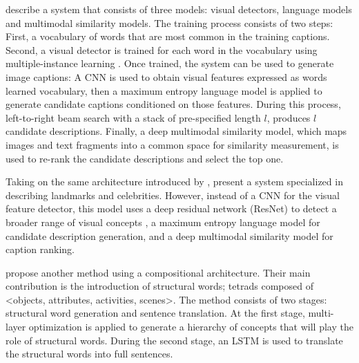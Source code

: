 \citet{Fang2015} describe a system that consists of three models: visual detectors, language models and multimodal similarity models. The training process consists of two steps: First, a vocabulary of words that are most common in the training captions. Second, a visual detector is trained for each word in the vocabulary using multiple-instance learning  \citep{Viola2005}. Once trained, the system can be used to generate image captions: A CNN \citep{Krizhevsky2012} is used to obtain visual features expressed as words learned vocabulary, then a maximum entropy language model \citep{Berger1996} is applied to generate candidate captions conditioned on those features. During this process, left-to-right beam search \citep{Ratnaparkhi2000} with a stack of pre-specified length $l$, produces $l$ candidate descriptions. Finally, a deep multimodal similarity model, which maps images and text fragments into a common space for similarity measurement, is used to re-rank the candidate descriptions and select the top one.

Taking on the same architecture introduced by \citet{Fang2015}, \citet{Tran2016} present a system specialized in describing landmarks and celebrities. However, instead of a CNN for the visual feature detector, this model uses a deep residual network (ResNet) to detect a broader range of visual concepts \cite{He2016resnet}, a maximum entropy language model for candidate description generation, and a deep multimodal similarity model for caption ranking. 

\citet{Ma2016} propose another method using a compositional architecture. Their main contribution is the introduction of structural words; tetrads composed of <objects, attributes, activities, scenes>. The method consists of two stages: structural word generation and sentence translation. At the first stage, multi-layer optimization is applied to generate a hierarchy of concepts that will play the role of structural words. During the second stage, an LSTM is used to translate the structural words into full sentences.


